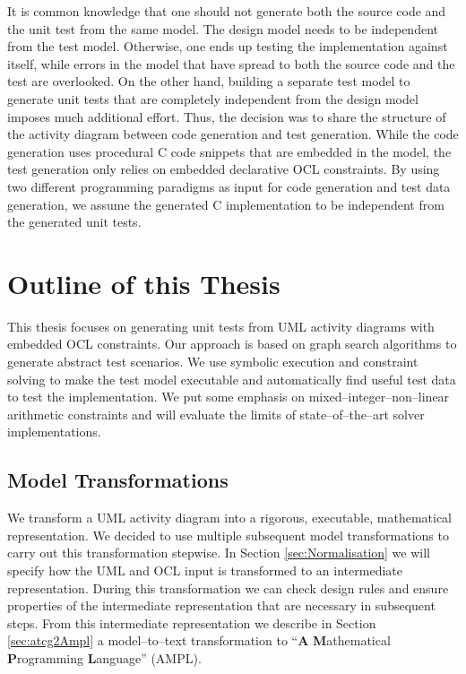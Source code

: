 It is common knowledge that one should not generate both the source code and the unit test from the same model. The design model needs to be independent from the test model. Otherwise, one ends up testing the implementation against itself, while errors in the model that have spread to both the source code and the test are overlooked.
On the other hand, building a separate test model to generate unit tests that are completely independent from the design model imposes much additional effort. Thus, the decision was to share the structure of the activity diagram between code generation and test generation. While the code generation uses procedural C code snippets that are embedded in the model, the test generation only relies on embedded declarative OCL constraints. By using two different programming paradigms as input for code generation and test data generation, we assume the generated C implementation to be independent from the generated unit tests.
\section{Outline of this Thesis}
This thesis focuses on generating unit tests from UML activity diagrams with embedded OCL constraints. Our approach is based on graph search algorithms to generate abstract test scenarios. We use symbolic execution and constraint solving to make the test model executable and automatically find useful test data to test the implementation. We put some emphasis on mixed--integer--non--linear arithmetic constraints and will evaluate the limits of state--of--the--art solver implementations.
\subsection{Model Transformations}
We transform a UML activity diagram into a rigorous, executable, mathematical representation. We decided to use multiple subsequent model transformations to carry out this transformation stepwise. In Section \ref{sec:Normalisation} we will specify how the UML and OCL input is transformed to an intermediate representation. During this transformation we can check design rules and ensure properties of the intermediate representation that are necessary in subsequent steps. From this intermediate representation we describe in Section \ref{sec:atcg2Ampl} a model--to--text transformation to ``\textbf{A} \textbf{M}athematical \textbf{P}rogramming \textbf{L}anguage'' (AMPL).

